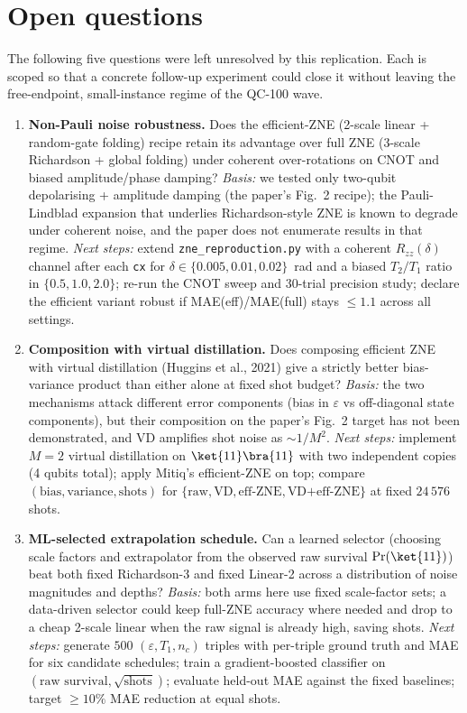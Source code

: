 \section{Open questions}

The following five questions were left unresolved by this replication.
Each is scoped so that a concrete follow-up experiment could close it
without leaving the free-endpoint, small-instance regime of the QC-100
wave.

\begin{enumerate}
\item \textbf{Non-Pauli noise robustness.}
Does the efficient-ZNE (2-scale linear + random-gate folding) recipe
retain its advantage over full ZNE (3-scale Richardson + global folding)
under coherent over-rotations on CNOT and biased amplitude/phase damping?
\emph{Basis:} we tested only two-qubit depolarising + amplitude damping
(the paper's Fig.~2 recipe); the Pauli-Lindblad expansion that underlies
Richardson-style ZNE is known to degrade under coherent noise, and the
paper does not enumerate results in that regime.
\emph{Next steps:} extend \texttt{zne\_reproduction.py} with a coherent
$R_{zz}(\delta)$ channel after each \texttt{cx} for
$\delta \in \{0.005, 0.01, 0.02\}$~rad and a biased $T_2/T_1$ ratio in
$\{0.5, 1.0, 2.0\}$; re-run the CNOT sweep and 30-trial precision study;
declare the efficient variant robust if MAE(eff)/MAE(full) stays
$\le 1.1$ across all settings.

\item \textbf{Composition with virtual distillation.}
Does composing efficient ZNE with virtual distillation (Huggins et al.,
2021) give a strictly better bias-variance product than either alone at
fixed shot budget?
\emph{Basis:} the two mechanisms attack different error components (bias
in $\varepsilon$ vs off-diagonal state components), but their composition
on the paper's Fig.~2 target has not been demonstrated, and VD amplifies
shot noise as $\sim 1/M^2$.
\emph{Next steps:} implement $M=2$ virtual distillation on
$\ket{11}\bra{11}$ with two independent copies (4 qubits total); apply
Mitiq's efficient-ZNE on top; compare
$(\text{bias}, \text{variance}, \text{shots})$ for
$\{\text{raw}, \text{VD}, \text{eff-ZNE}, \text{VD+eff-ZNE}\}$ at fixed
$24\,576$ shots.

\item \textbf{ML-selected extrapolation schedule.}
Can a learned selector (choosing scale factors and extrapolator from the
observed raw survival $\Pr(\ket{11})$) beat both fixed Richardson-3 and
fixed Linear-2 across a distribution of noise magnitudes and depths?
\emph{Basis:} both arms here use fixed scale-factor sets; a data-driven
selector could keep full-ZNE accuracy where needed and drop to a cheap
2-scale linear when the raw signal is already high, saving shots.
\emph{Next steps:} generate $500$ $(\varepsilon, T_1, n_c)$ triples with
per-triple ground truth and MAE for six candidate schedules; train a
gradient-boosted classifier on
$(\text{raw survival}, \sqrt{\text{shots}})$; evaluate held-out MAE
against the fixed baselines; target $\ge 10\%$ MAE reduction at equal
shots.


\end{enumerate}
